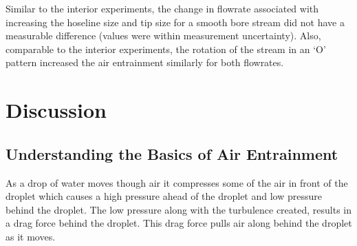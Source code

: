 \documentclass[12pt,oneside]{book}
\begin{document}
Similar to the interior experiments, the change in flowrate associated with increasing the hoseline size and tip size for a smooth bore stream did not have a measurable difference (values were within measurement uncertainty). Also, comparable to the interior experiments, the rotation of the stream in an `O' pattern increased the air entrainment similarly for both flowrates.





\chapter{Discussion}

\section{Understanding the Basics of Air Entrainment}
As a drop of water moves though air it compresses some of the air in front of the droplet which causes a high pressure ahead of the droplet and low pressure behind the droplet. The low pressure along with the turbulence created, results in a drag force behind the droplet. This drag force pulls air along behind the droplet as it moves.
\end{document}
